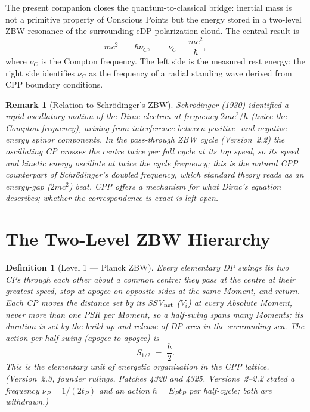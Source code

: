 \documentclass[12pt]{article}
\newtheorem{definition}[theorem]{Definition}
\newtheorem{remark}[theorem]{Remark}
\newcommand{\EP}{E_P}
\newcommand{\tP}{t_P}
\newcommand{\nuP}{\nu_P}
\newcommand{\nuC}{\nu_C}
\begin{document}
The present companion closes the quantum-to-classical bridge: inertial mass
is not a primitive property of Conscious Points but the energy stored in a
two-level ZBW resonance of the surrounding eDP polarization cloud.  The
central result is
\begin{equation}
  mc^2 \;=\; \hbar\nuC, \qquad \nuC = \frac{mc^2}{\hbar},
  \label{eq:mass-compton}
\end{equation}
where $\nuC$ is the Compton frequency.  The left side is the measured rest
energy; the right side identifies $\nuC$ as the frequency of a radial
standing wave derived from CPP boundary conditions.

\begin{remark}[Relation to Schr\"odinger's ZBW]
Schr\"odinger (1930) identified a rapid oscillatory motion of the Dirac
electron at frequency $2mc^2/\hbar$ (twice the Compton frequency), arising
from interference between positive- and negative-energy spinor components.
In the pass-through ZBW cycle (Version~2.2) the oscillating CP crosses the
centre twice per full cycle at its top speed, so its speed and kinetic
energy oscillate at twice the cycle frequency; this is the natural CPP
counterpart of Schr\"odinger's doubled frequency, which standard theory
reads as an energy-gap ($2mc^2$) beat.  CPP offers a mechanism for what
Dirac's equation describes; whether the correspondence is exact is left open.
\end{remark}

\section{The Two-Level ZBW Hierarchy}
\label{sec:hierarchy}

\begin{definition}[Level 1 --- Planck ZBW]
Every elementary DP swings its two CPs through each other about a common
centre: they pass at the centre at their greatest speed, stop at apogee on
opposite sides at the same Moment, and return.  Each CP moves the distance set
by its SSV$_{\rm net}$ ($V_i$) at every Absolute Moment, never more than one
PSR per Moment, so a half-swing spans many Moments; its duration is set by
the build-up and release of DP-arcs in the surrounding sea.  The action per
half-swing (apogee to apogee) is
\begin{equation}
  S_{1/2} \;=\; \frac{\hbar}{2}.
  \label{eq:nu-planck}
\end{equation}
This is the elementary unit of energetic organization in the CPP lattice.
\emph{(Version~2.3, founder rulings, Patches 4320 and 4325.  Versions~2--2.2
stated a frequency $\nuP = 1/(2\tP)$ and an action $\hbar = \EP\tP$ per
half-cycle; both are withdrawn.)}
\end{definition}
\end{document}
